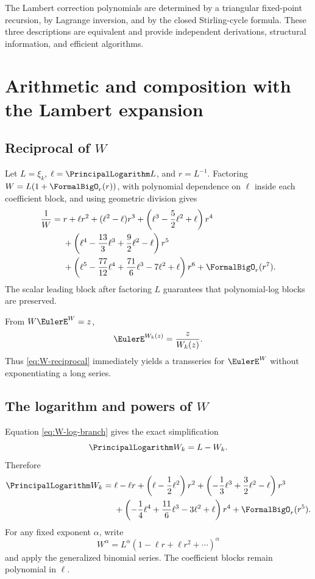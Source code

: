 \documentclass[11pt,openany]{book}
\theoremstyle{definition}
\theoremstyle{plain}
\theoremstyle{remark}
\begin{document}
\begin{summarybox}
The Lambert correction polynomials are determined by a triangular fixed-point recursion, by Lagrange inversion, and by the closed Stirling-cycle formula. These three descriptions are equivalent and provide independent derivations, structural information, and efficient algorithms.
\end{summarybox}

\chapter{Arithmetic and composition with the Lambert expansion}\label{ch:W-operations}

\section{Reciprocal of \texorpdfstring{\(W\)}{W}}
Let \(L=\xi_k\), \(\ell=\PrincipalLogarithm L\), and \(r=L^{-1}\). Factoring \(W=L(1+\FormalBigO_r(r))\), with polynomial dependence on \(\ell\) inside each coefficient block, and using geometric division gives
\begin{align}
 \frac1W={}&r+\ell r^2+(\ell^2-\ell)r^3
 +\left(\ell^3-\frac52\ell^2+\ell\right)r^4\notag\\
 &+\left(\ell^4-\frac{13}{3}\ell^3+\frac92\ell^2-\ell\right)r^5\notag\\
 &+\left(\ell^5-\frac{77}{12}\ell^4+\frac{71}{6}\ell^3-7\ell^2+\ell\right)r^6
 +\FormalBigO_r(r^7).
\label{eq:W-reciprocal}
\end{align}
The scalar leading block after factoring \(L\) guarantees that polynomial-log blocks are preserved.

From \(W\EulerE^W=z\),
\begin{equation}\label{eq:expW}
 \EulerE^{W_k(z)}=\frac{z}{W_k(z)}.
\end{equation}
Thus \cref{eq:W-reciprocal} immediately yields a transseries for \(\EulerE^W\) without exponentiating a long series.

\section{The logarithm and powers of \texorpdfstring{\(W\)}{W}}
Equation \cref{eq:W-log-branch} gives the exact simplification
\begin{equation}\label{eq:logW-exact}
 \PrincipalLogarithm W_k=L-W_k.
\end{equation}
Therefore
\begin{align}
 \PrincipalLogarithm W_k={}&\ell-\ell r
 +\left(\ell-\frac12\ell^2\right)r^2
 +\left(-\frac13\ell^3+\frac32\ell^2-\ell\right)r^3\notag\\
 &+\left(-\frac14\ell^4+\frac{11}{6}\ell^3-3\ell^2+\ell\right)r^4
 +\FormalBigO_r(r^5).
\label{eq:logW-series}
\end{align}
For any fixed exponent \(\alpha\), write
\[
 W^\alpha=L^\alpha\left(1-\ell r+\ell r^2+\cdots\right)^\alpha
\]
and apply the generalized binomial series. The coefficient blocks remain polynomial in \(\ell\).
\end{document}
